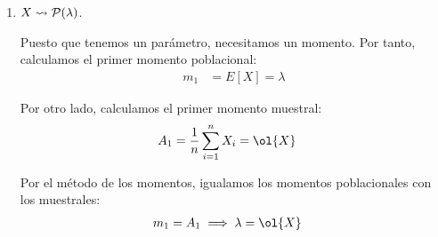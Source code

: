 \begin{ejemplo}
\begin{enumerate}
        Por otro lado, calculamos el primer y segundo momento muestrales:
        \begin{align*}
            A_1 &= \frac{1}{n} \sum_{i=1}^{n} X_i = \ol{X}\\
            A_2 &= \frac{1}{n} \sum_{i=1}^{n} X_i^2
        \end{align*}

        Por el método de los momentos, igualamos los momentos poblacionales con los muestrales:
        \begin{align*}
            m_1 &= A_1 \implies \frac{a + b}{2} = \ol{X} \implies a + b = 2\ol{X} \\
            m_2 &= A_2 \implies \frac{a^2 + ab + b^2}{3} = A_2
        \end{align*}

        Resolviendo el sistema de ecuaciones, obtenemos:
        \begin{align*}
            a &= \ol{X} - \sqrt{3}\sqrt{A_2 - \ol{X}^2}
            b &= \ol{X} + \sqrt{3}\sqrt{A_2 - \ol{X}^2}
        \end{align*}

        Por tanto, los estimadores por el método de los momentos son:
        \begin{align*}
            \hat{a} = \ol{X} - \sqrt{3}\sqrt{A_2 - \ol{X}^2},\qquad \hat{b} = \ol{X} + \sqrt{3}\sqrt{A_2 - \ol{X}^2}
        \end{align*}

        Sería necesario comprobar que efectivamente $\hat{a}$ y $\hat{b}$ son estimadores de $a$ y $b$, respectivamente, pero se tiene. Por tanto, podemos concluir que $\hat{a}$ y $\hat{b}$ son los estimadores por el método de los momentos de $a$ y $b$, respectivamente.

        \item $X \rightsquigarrow \mathcal{P}(\lambda)$.
        
        Puesto que tenemos un parámetro, necesitamos un momento. Por tanto, calculamos el primer momento poblacional:
        \begin{align*}
            m_1 &= E[X] = \lambda
        \end{align*}

        Por otro lado, calculamos el primer momento muestral:
        \begin{align*}
            A_1 &= \frac{1}{n} \sum_{i=1}^{n} X_i = \ol{X}
        \end{align*}

        Por el método de los momentos, igualamos los momentos poblacionales con los muestrales:
        \begin{align*}
            m_1 &= A_1 \implies \lambda = \ol{X}
        \end{align*}


\end{enumerate}
\end{ejemplo}
